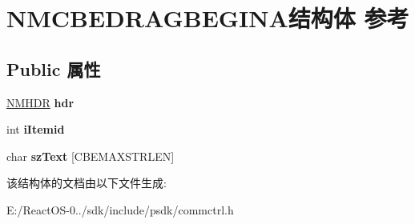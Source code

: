 \hypertarget{struct_n_m_c_b_e_d_r_a_g_b_e_g_i_n_a}{}\section{N\+M\+C\+B\+E\+D\+R\+A\+G\+B\+E\+G\+I\+N\+A结构体 参考}
\label{struct_n_m_c_b_e_d_r_a_g_b_e_g_i_n_a}
\subsection*{Public 属性}
\begin{DoxyCompactItemize}
\item 
\mbox{\label{struct_n_m_c_b_e_d_r_a_g_b_e_g_i_n_a_afb431bc9ababc718426b918aa1ae4fc2}} 
\hyperlink{structtag_n_m_h_d_r}{N\+M\+H\+DR} {\bfseries hdr}
\item 
\mbox{\label{struct_n_m_c_b_e_d_r_a_g_b_e_g_i_n_a_af6420e38ea240ac889b80c07e6d63a06}} 
int {\bfseries i\+Itemid}
\item 
\mbox{\label{struct_n_m_c_b_e_d_r_a_g_b_e_g_i_n_a_adc9daa852c6cb84d230baab06610ad0f}} 
char {\bfseries sz\+Text} \mbox{[}C\+B\+E\+M\+A\+X\+S\+T\+R\+L\+EN\mbox{]}
\end{DoxyCompactItemize}


该结构体的文档由以下文件生成\+:\begin{DoxyCompactItemize}
\item 
E\+:/\+React\+O\+S-\/0../sdk/include/psdk/commctrl.\+h\end{DoxyCompactItemize}
